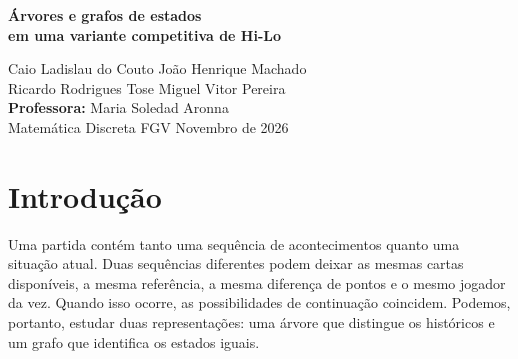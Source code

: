 \documentclass[11pt,a4paper]{article}
\theoremstyle{definition}
\begin{document}
\thispagestyle{plain}
\begin{center}
{\LARGE\bfseries Árvores e grafos de estados\\[3pt]
em uma variante competitiva de Hi-Lo\par}
\vspace{0.45cm}
Caio Ladislau do Couto \quad João Henrique Machado\\
Ricardo Rodrigues Tose \quad Miguel Vitor Pereira\\[6pt]
\textbf{Professora:} Maria Soledad Aronna\\
Matemática Discreta \quad FGV \quad Novembro de 2026
\end{center}
\vspace{0.15cm}
\begin{abstract}
Estudamos uma variante de Hi-Lo na qual dois jogadores preveem a relação entre a próxima carta e a referência atual. Um acerto pontua e conserva a vez; um erro transfere a vez. Representamos as partidas por uma árvore de históricos e reunimos históricos equivalentes em um grafo de estados. Demonstramos que esse grafo é dirigido acíclico e descrevemos, por um invariante de paridade, todos os pares de diferença de pontos e jogador da vez em cada camada. Essa descrição fornece uma fórmula fechada para o número de estados de qualquer composição inicial de cartas. Contamos também as folhas da árvore e os estados terminais. Provamos que o grafo associado é bipartido, é uma árvore exatamente quando restam no máximo duas cartas e, nos demais casos, contém um ciclo mínimo de quatro arestas. Relacionamos entradas múltiplas, árvores geradoras e arestas excedentes. Os resultados são ilustrados em finais reduzidos e aplicados ao baralho original de 36 cartas, cujo grafo, após a referência inicial, possui 402.187.501 estados. Essa contagem é obtida pela fórmula, sem construir o grafo completo.
\end{abstract}
\section{Introdução}
Uma partida contém tanto uma sequência de acontecimentos quanto uma situação atual. Duas sequências diferentes podem deixar as mesmas cartas disponíveis, a mesma referência, a mesma diferença de pontos e o mesmo jogador da vez. Quando isso ocorre, as possibilidades de continuação coincidem. Podemos, portanto, estudar duas representações: uma árvore que distingue os históricos e um grafo que identifica os estados iguais.
\end{document}
